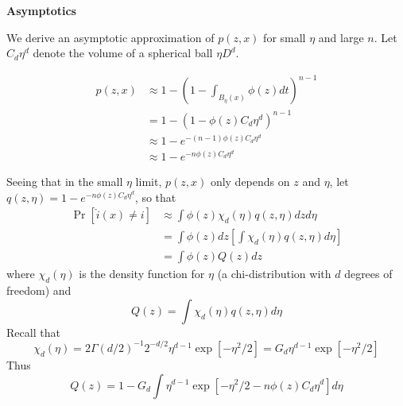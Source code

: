 \documentclass[11pt]{article}
\begin{document}
\noindent\textbf{Asymptotics}

We derive an asymptotic approximation of $p(z,x)$ for small $\eta$ and large $n$.
Let $C_d \eta^d$ denote the volume of a spherical ball $\eta D^d$.

\begin{align*}
p(z, x) 
&\approx 1 - \left(1 - \int_{B_\eta(x)} \phi(z) dt \right)^{n-1}
\\&= 1 - (1 - \phi(z)C_d \eta^d)^{n-1}
\\&\approx 1 - e^{-(n-1)\phi(z)C_d\eta^d}
\\&\approx 1 - e^{-n\phi(z)C_d\eta^d}
\end{align*}

Seeing that in the small $\eta$ limit, $p(z, x)$ only depends on $z$
and $\eta$, let $q(z, \eta) = 1 - e^{-n\phi(z)C_d\eta^d}$, so that
\begin{align*}
\Pr[\hat{i}(x) \neq i] &\approx \int \phi(z) \chi_d(\eta) q(z, \eta) dz d\eta
\\&= \int \phi(z) dz \left[\int \chi_d(\eta) q(z, \eta) d\eta\right]
\\&= \int \phi(z) Q(z) dz 
\end{align*}
where $\chi_d(\eta)$ is the density function for $\eta$ (a
chi-distribution with $d$ degrees of freedom)
and
\[
Q(z) = \int \chi_d(\eta) q(z, \eta) d\eta
\]
Recall that
\[
\chi_d(\eta) = 2 \Gamma(d/2)^{-1} 2^{-d/2} \eta^{d-1} \exp[-\eta^2/2]
= G_d \eta^{d-1} \exp[-\eta^2/2]
\]
Thus
\[
Q(z) = 1- G_d \int \eta^{d-1} \exp[-\eta^2/2 - n\phi(z) C_d\eta^d]d\eta
\]
\end{document}
